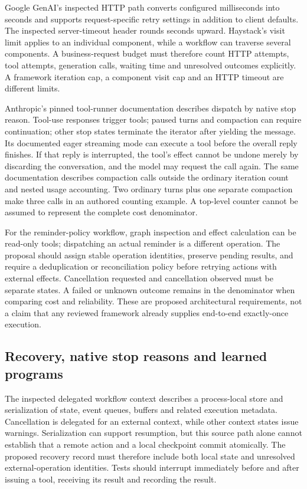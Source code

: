 Google GenAI's inspected HTTP path converts configured milliseconds into seconds and supports
request-specific retry settings in addition to client defaults. The inspected server-timeout header
rounds seconds upward. Haystack's visit limit applies to an individual component, while a workflow
can traverse several components. A business-request budget must therefore count HTTP attempts,
tool attempts, generation calls, waiting time and unresolved outcomes explicitly. A framework
iteration cap, a component visit cap and an HTTP timeout are different limits.
\citep{exec28_dl_google,exec28_dl_haystack}

Anthropic's pinned tool-runner documentation describes dispatch by native stop reason. Tool-use
responses trigger tools; paused turns and compaction can require continuation; other stop states
terminate the iterator after yielding the message. Its documented eager streaming mode can execute
a tool before the overall reply finishes. If that reply is interrupted, the tool's effect cannot be
undone merely by discarding the conversation, and the model may request the call again. The same
documentation describes compaction calls outside the ordinary iteration count and nested usage
accounting. Two ordinary turns plus one separate compaction make three calls in an authored counting
example. A top-level counter cannot be assumed to represent the complete cost denominator.
\citep{exec28_dl_anthropic,exec28_dl_reference}

For the reminder-policy workflow, graph inspection and effect calculation can be read-only tools;
dispatching an actual reminder is a different operation. The proposal should assign stable operation
identities, preserve pending results, and require a deduplication or reconciliation policy before
retrying actions with external effects. Cancellation requested and cancellation observed must be
separate states. A failed or unknown outcome remains in the denominator when comparing cost and
reliability. These are proposed architectural requirements, not a claim that any reviewed framework
already supplies end-to-end exactly-once execution.

\subsection{Recovery, native stop reasons and learned programs}
The inspected delegated workflow context describes a process-local store and serialization of
state, event queues, buffers and related execution metadata. Cancellation is delegated for an
external context, while other context states issue warnings. Serialization can support resumption,
but this source path alone cannot establish that a remote action and a local checkpoint commit
atomically. The proposed recovery record must therefore include both local state and unresolved
external-operation identities. Tests should interrupt immediately before and after issuing a tool,
receiving its result and recording the result.\citep{exec28_dl_workflows}

